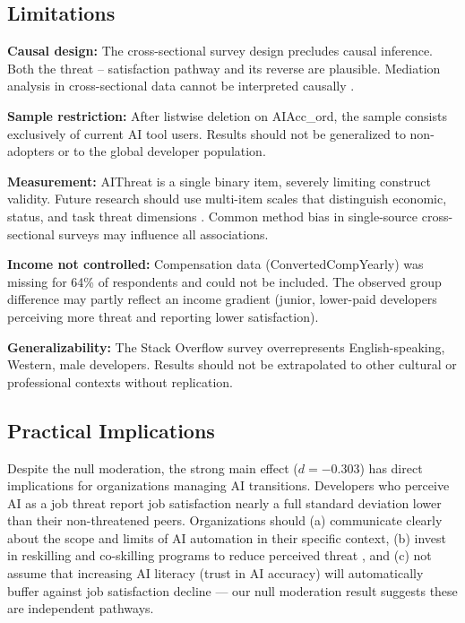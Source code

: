 \documentclass[11pt]{article}
\begin{document}
\subsection{Limitations}
\textbf{Causal design:} The cross-sectional survey design precludes causal inference.
Both the threat -- satisfaction pathway and its reverse are plausible. Mediation
analysis in cross-sectional data cannot be interpreted causally \citep{bullock2010mediation}.

\textbf{Sample restriction:} After listwise deletion on AIAcc\_ord, the sample
consists exclusively of current AI tool users. Results should not be generalized
to non-adopters or to the global developer population.

\textbf{Measurement:} AIThreat is a single binary item, severely limiting construct
validity. Future research should use multi-item scales that distinguish economic,
status, and task threat dimensions \citep{reich2026work}. Common method bias
in single-source cross-sectional surveys may influence all associations.

\textbf{Income not controlled:} Compensation data (ConvertedCompYearly) was missing
for 64\% of respondents and could not be included. The observed group difference
may partly reflect an income gradient (junior, lower-paid developers perceiving
more threat and reporting lower satisfaction).

\textbf{Generalizability:} The Stack Overflow survey overrepresents English-speaking,
Western, male developers. Results should not be extrapolated to other cultural or
professional contexts without replication.

\subsection{Practical Implications}
Despite the null moderation, the strong main effect ($d = -0.303$) has direct
implications for organizations managing AI transitions. Developers who perceive AI
as a job threat report job satisfaction nearly a full standard deviation lower than
their non-threatened peers. Organizations should (a) communicate clearly about the
scope and limits of AI automation in their specific context, (b) invest in
reskilling and co-skilling programs to reduce perceived threat \citep{zhang2025empowering},
and (c) not assume that increasing AI literacy (trust in AI accuracy) will
automatically buffer against job satisfaction decline --- our null moderation result
suggests these are independent pathways.
\end{document}
